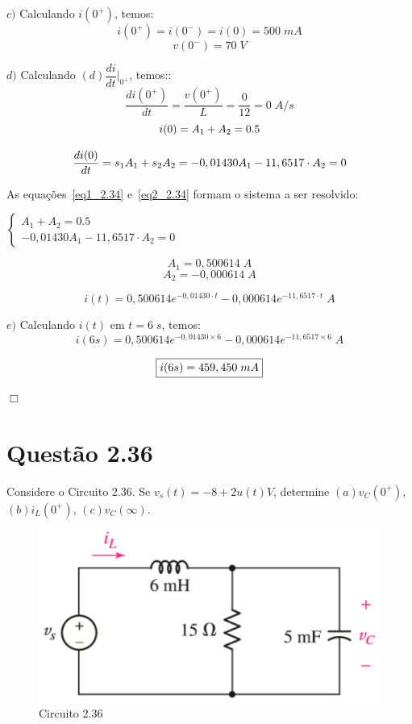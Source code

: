 \documentclass[
	12pt,				%
	oneside,			%
	a4paper,			%
	english,			%
	french,				%
	spanish,			%
	brazil				%
	]{abntex2}
\begin{document}
$c)$ Calculando $i(0^+)$, temos:
$$i(0^+)=i(0^-)=i(0)=500\;mA$$
$$v(0^-)=70\;V$$

$d)$ Calculando $(d)\dfrac{di}{dt}\Bigg|_{0^+}^{}$, temos::
$${\dfrac{di(0^+)}{dt}}={\dfrac{v(0^+)}{L}}={\dfrac{0}{12}}=0\;A/s$$
\newpage
\begin{equation}
    \centering
    i(0)=A_1+A_2 = 0.5
    \label{eq1_2.34}
\end{equation}

\begin{equation}
    \centering
    {\dfrac{di(0)}{dt}}=s_1A_1+s_2A_2 = -0,01430A_1-11,6517\cdot A_2=0
    \label{eq2_2.34}
\end{equation}

As equações~\eqref{eq1_2.34} e~\eqref{eq2_2.34} formam o sistema a ser resolvido:

$\begin{cases}
A_1+A_2=0.5 \\
-0,01430A_1-11,6517\cdot A_2=0
\end{cases}$

$$A_1=0,500614\;A$$
$$A_2=-0,000614\;A$$

$$i(t)=0,500614e^{-0,01430\cdot t}-0,000614e^{-11,6517\cdot t}\;A$$

$e)$ Calculando $i(t)$ em $t=6\;s$, temos:
$$i(6s)=0,500614e^{-0,01430\times 6}-0,000614e^{-11,6517\times 6}\;A$$

\begin{equation}
    \fbox{$i(6s)=459,450\;mA$}
\end{equation}

\begin{flushright}
    $\Box$
\end{flushright}
\newpage


\section*{Questão 2.36}
Considere o Circuito 2.36. Se $v_s(t) = -8 + 2u(t) V$, determine $(a)v_C(0^+)$, $(b)i_L(0^+)$, $(c)v_C(\infty)$. 

\begin{figure}[htb]
	\centering
	\includegraphics[scale=0.5]{2-36.PNG}
	\caption{Circuito 2.36}
\end{figure}
\end{document}
